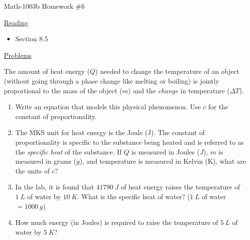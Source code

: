 \documentclass[letterpaper,12pt,fleqn]{article}
\begin{document}
\begin{center}
\Large Math-1003b Homework \#6
\end{center}

\vspace{0.5in}

\underline{Reading}

\bigskip

\begin{itemize}
\item Section 8.5
\end{itemize}

\bigskip

\underline{Problems}

\bigskip

The amount of heat energy ($Q$) needed to change the temperature of an
object (without going through a phase change like melting or boiling) is jointly
proportional to the mass of the object ($m$) and the \emph{change} in
temperature ($\Delta T$).
\begin{enumerate}
\item Write an equation that models this physical phenomenon. Use $c$ for the
  constant of proportionality.
\item The MKS unit for heat energy is the Joule (J). The constant of
  proportionality is specific to the substance being heated and is referred to
  as the \emph{specific heat} of the substance. If $Q$ is measured in Joules
  ($J$), $m$ is measured in grams ($g$), and temperature is measured in Kelvin
  (K), what are the units of $c$?
\item In the lab, it is found that $\SI{41790}{J}$ of heat energy raises the
  temperature of $\SI{1}{L}$ of water by $\SI{10}{K}$. What is the specific heat
  of water? ($\SI{1}{L}$ of water$=\SI{1000}{g}$)
\item How much energy (in Joules) is required to raise the temperature of
  $\SI{5}{L}$ of water by $\SI{5}{K}$?
\end{enumerate}
\end{document}
